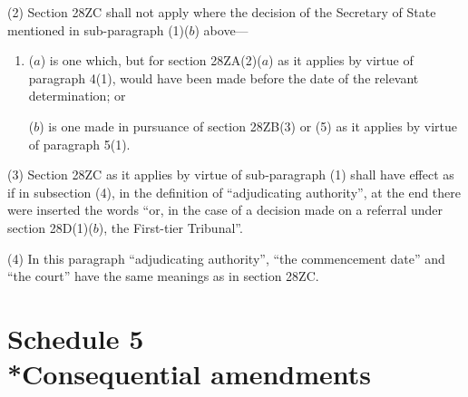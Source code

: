 \documentclass[a4paper]{article}
\begin{document}
{(2) Section 28ZC shall not apply where the decision of the Secretary of State mentioned in sub-paragraph (1)($b$) above---
\begin{enumerate}\item[]
($a$) is one which, but for section 28ZA(2)($a$) as it applies by virtue of paragraph 4(1), would have been made before the date of the relevant determination; or

($b$) is one made in pursuance of section 28ZB(3) or (5) as it applies by virtue of paragraph 5(1).
\end{enumerate}

(3) Section 28ZC as it applies by virtue of sub-paragraph (1) shall have effect as if in subsection (4), in the definition of “adjudicating authority”, at the end there were inserted the words “or, in the case of a decision made on a referral under section 28D(1)($b$), the First-tier Tribunal”.

(4) In this paragraph “adjudicating authority”, “the commencement date” and “the court” have the same meanings as in section 28ZC.


}

\part[Schedule 5 --- Consequential amendments]{Schedule 5\\*Consequential amendments}

\renewcommand\parthead{--- Schedule 5}


%
%
%
\end{document}
